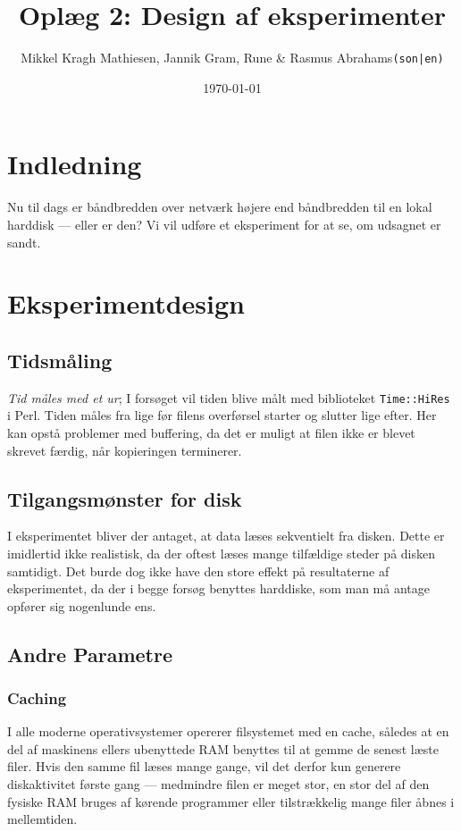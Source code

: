 \documentclass{article}
\author{Mikkel Kragh Mathiesen, Jannik Gram, Rune \& Rasmus Abrahams{\tt (son|en)}}
\title{Oplæg 2: Design af eksperimenter}
\date{\today}
\begin{document}
\maketitle

\newpage

\tableofcontents

\newpage

\section{Indledning}
Nu til dags er båndbredden over netværk højere end båndbredden til en lokal harddisk --- eller er den? Vi vil udføre et eksperiment for at se, om udsagnet er sandt.

\section{Eksperimentdesign}

\subsection{Tidsmåling}
\textit{Tid måles med et ur}; I forsøget vil tiden blive målt med biblioteket {\tt Time::HiRes} i Perl. Tiden måles fra lige før filens overførsel starter og slutter lige efter. Her kan opstå problemer med buffering, da det er muligt at filen ikke er blevet skrevet færdig, når kopieringen terminerer.

\subsection{Tilgangsmønster for disk}
I eksperimentet bliver der antaget, at data læses sekventielt fra disken. Dette er imidlertid ikke realistisk, da der oftest læses mange tilfældige steder på disken samtidigt. Det burde dog ikke have den store effekt på resultaterne af eksperimentet, da der i begge forsøg benyttes harddiske, som man må antage opfører sig nogenlunde ens.

\subsection{Andre Parametre}
\subsubsection{Caching}
I alle moderne operativsystemer opererer filsystemet med en cache, således at en del af maskinens ellers ubenyttede RAM benyttes til at gemme de senest læste filer. Hvis den samme fil læses mange gange, vil det derfor kun generere diskaktivitet første gang --- medmindre filen er meget stor, en stor del af den fysiske RAM bruges af kørende programmer eller tilstrækkelig mange filer åbnes i mellemtiden.
\end{document}
